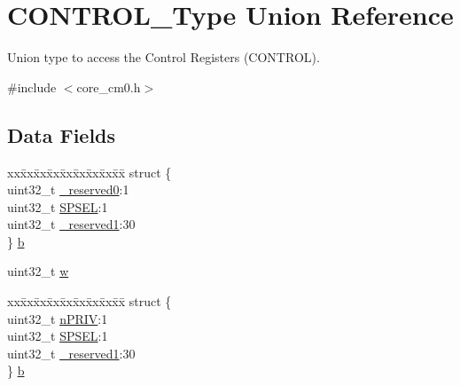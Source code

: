 \hypertarget{union_c_o_n_t_r_o_l___type}{}\section{C\+O\+N\+T\+R\+O\+L\+\_\+\+Type Union Reference}
\label{union_c_o_n_t_r_o_l___type}


Union type to access the Control Registers (C\+O\+N\+T\+R\+OL).  




{\ttfamily \#include $<$core\+\_\+cm0.\+h$>$}

\subsection*{Data Fields}
\begin{DoxyCompactItemize}
\item 
\begin{tabbing}
xx\=xx\=xx\=xx\=xx\=xx\=xx\=xx\=xx\=\kill
struct \{\\
\>uint32\_t \mbox{\hyperlink{union_c_o_n_t_r_o_l___type_ac8a6a13838a897c8d0b8bc991bbaf7c1}{\_reserved0}}:1\\
\>uint32\_t \mbox{\hyperlink{union_c_o_n_t_r_o_l___type_ae185aac93686ffc78e998a9daf41415b}{SPSEL}}:1\\
\>uint32\_t \mbox{\hyperlink{union_c_o_n_t_r_o_l___type_a959a73d8faee56599b7e792a7c5a2d16}{\_reserved1}}:30\\
\} \mbox{\hyperlink{union_c_o_n_t_r_o_l___type_ab2a41711c248a319c2e7d0ab73c3a8b9}{b}}\\

\end{tabbing}\item 
uint32\+\_\+t \mbox{\hyperlink{union_c_o_n_t_r_o_l___type_ad0fb62e7a08e70fc5e0a76b67809f84b}{w}}
\item 
\begin{tabbing}
xx\=xx\=xx\=xx\=xx\=xx\=xx\=xx\=xx\=\kill
struct \{\\
\>uint32\_t \mbox{\hyperlink{union_c_o_n_t_r_o_l___type_a2a6e513e8a6bf4e58db169e312172332}{nPRIV}}:1\\
\>uint32\_t \mbox{\hyperlink{union_c_o_n_t_r_o_l___type_ae185aac93686ffc78e998a9daf41415b}{SPSEL}}:1\\
\>uint32\_t \mbox{\hyperlink{union_c_o_n_t_r_o_l___type_a959a73d8faee56599b7e792a7c5a2d16}{\_reserved1}}:30\\
\} \mbox{\hyperlink{union_c_o_n_t_r_o_l___type_a362f58ce033c684dddd5ae69c5417ef5}{b}}\\


\end{tabbing}
\end{DoxyCompactItemize}
